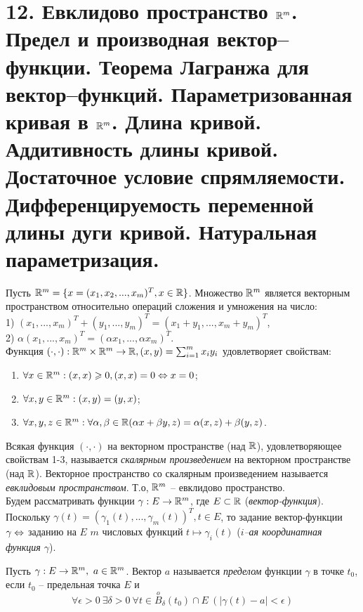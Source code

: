 \section{12. Евклидово пространство $\mathbb{R}^{m}$. Предел и производная вектор--функции. Теорема Лагранжа для вектор--функций. Параметризованная кривая в $\mathbb{R}^{m}$. Длина кривой. Аддитивность длины кривой. Достаточное условие спрямляемости. Дифференцируемость переменной длины дуги кривой. Натуральная параметризация.}

    Пусть $\mathbb{R}^{m} = \{x = (x_{1}, x_{2}, ... , x_{m})^{T}, x \in \mathbb{R}\}$. Множество $\mathbb{R}^m$ является векторным пространством относительно операций сложения и умножения на число:\\
    1) $(x_{1}, ... , x_{m})^{T} + (y_{1}, ... , y_{m})^{T} = (x_{1} + y_{1}, ... , x_{m} + y_{m})^{T}$,\\
    2) $\alpha (x_{1}, ... , x_{m})^{T} = (\alpha x_{1}, ... , \alpha x_{m})^{T}$.\\
    Функция $(\cdot, \cdot): \mathbb{R}^{m} \times \mathbb{R}^{m} \to \mathbb{R}, (x, y) = \sum_{i = 1}^{m}x_{i}y_{i}$ удовлетворяет свойствам:
    \begin{enumerate}
        \item $\forall x \in \mathbb{R}^{m}: (x, x) \geqslant 0, (x, x) = 0 \Leftrightarrow x = 0$;
        \item $\forall x, y \in \mathbb{R}^{m}: (x, y) = (y, x)$;
        \item $\forall x, y, z \in \mathbb{R}^{m}: \forall \alpha, \beta \in \mathbb{R} (\alpha x + \beta y, z) = \alpha(x, z) + \beta(y, z)$.
    \end{enumerate}
    
    Всякая функция $(\cdot, \cdot)$ на векторном пространстве (над $\mathbb{R}$), удовлетворяющее свойствам 1-3, называется \textit{скалярным произведением} на векторном пространстве (над $\mathbb{R}$). Векторное пространство со скалярным произведением называется \textit{евклидовым пространством}. Т.о, $\mathbb{R}^{m}$ -- евклидово пространство.\\
    Будем рассматривать функции $\gamma: E \to \mathbb{R}^{m}$, где $E \subset \mathbb{R}$ (\textit{вектор-функция}). Поскольку $\gamma(t) = (\gamma_{1}(t) , ... , \gamma_{m}(t))^{T}, t \in E$, то задание вектор-функции $\gamma \Leftrightarrow$ заданию на $E$ $m$ числовых функций $t \mapsto \gamma_{i}(t)$ (\textit{$i$--ая координатная функция $\gamma$}).
    
    \begin{definition}
        Пусть $\gamma: E \to \mathbb{R}^{m}, \ a \in \mathbb{R}^{m}$. Вектор $a$ называется \textit{пределом} функции $\gamma$ в точке $t_{0}$, если $t_{0}$ -- предельная точка $E$ и 
        \[\forall \epsilon > 0 \ \exists \delta > 0 \ \forall t \in \overset{o}{B}_{\delta}(t_{0}) \cap E \ (|\gamma(t) - a| < \epsilon)\]
    \end{definition}
    
